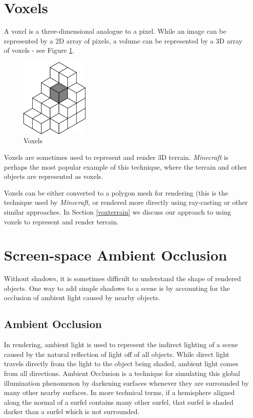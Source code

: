 \section{Voxels} \label{voxels}

A voxel is a three-dimensional analogue to a pixel.
While an image can be represented by a 2D array of pixels, a volume can be represented by a 3D array of voxels - see Figure \ref{fig:voxels}.

\begin{figure}
	\centering
		\includegraphics[width=0.3\textwidth]{figures/voxels}
	\caption{Voxels}
	\label{fig:voxels}
\end{figure}

Voxels are sometimes used to represent and render 3D terrain.
{\em Minecraft} is perhaps the most popular example of this technique, where the terrain and other objects are represented as voxels.

Voxels can be either converted to a polygon mesh for rendering (this is the technique used by {\em Minecraft}, or rendered more directly using ray-casting or other similar approaches.
In Section \ref{voxterrain} we discuss our approach to using voxels to represent and render terrain.


\section{Screen-space Ambient Occlusion} \label{ssao}

Without shadows, it is sometimes difficult to understand the shape of rendered objects.
One way to add simple shadows to a scene is by accounting for the occlusion of ambient light caused by nearby objects.


\subsection{Ambient Occlusion}

In rendering, ambient light is used to represent the indirect lighting of a scene caused by the natural reflection of light off of all objects.
While direct light travels directly from the light to the object being shaded, ambient light comes from all directions.
Ambient Occlusion is a technique for simulating this global illumination phenomenon by darkening surfaces whenever they are surrounded by many other nearby surfaces.
In more technical terms, if a hemisphere aligned along the normal of a surfel contains many other surfel, that surfel is shaded darker than a surfel which is not surrounded.

